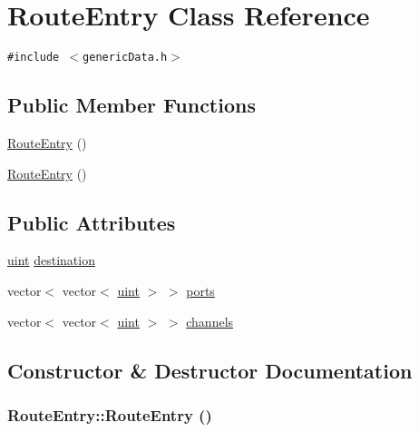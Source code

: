 \hypertarget{classRouteEntry}{
\section{RouteEntry Class Reference}
\label{classRouteEntry}
}
{\tt \#include $<$genericData.h$>$}

\subsection*{Public Member Functions}
\begin{CompactItemize}
\item 
\hyperlink{classRouteEntry_2823cc34016bfd3b831ca8a9e15d19af}{RouteEntry} ()
\item 
\hyperlink{classRouteEntry_2823cc34016bfd3b831ca8a9e15d19af}{RouteEntry} ()
\end{CompactItemize}
\subsection*{Public Attributes}
\begin{CompactItemize}
\item 
\hyperlink{outputBuffer_8h_91ad9478d81a7aaf2593e8d9c3d06a14}{uint} \hyperlink{classRouteEntry_470e2ba2804fa9bc03f346c6affbc81b}{destination}
\item 
vector$<$ vector$<$ \hyperlink{outputBuffer_8h_91ad9478d81a7aaf2593e8d9c3d06a14}{uint} $>$ $>$ \hyperlink{classRouteEntry_76532598e6bfd96c82faca9e5bc216a5}{ports}
\item 
vector$<$ vector$<$ \hyperlink{outputBuffer_8h_91ad9478d81a7aaf2593e8d9c3d06a14}{uint} $>$ $>$ \hyperlink{classRouteEntry_932298835da30e9e91f005a4566c8932}{channels}
\end{CompactItemize}


\subsection{Constructor \& Destructor Documentation}
\hypertarget{classRouteEntry_2823cc34016bfd3b831ca8a9e15d19af}{
\subsubsection[{RouteEntry}]{\setlength{\rightskip}{0pt plus 5cm}RouteEntry::RouteEntry ()}}
\label{classRouteEntry_2823cc34016bfd3b831ca8a9e15d19af}


